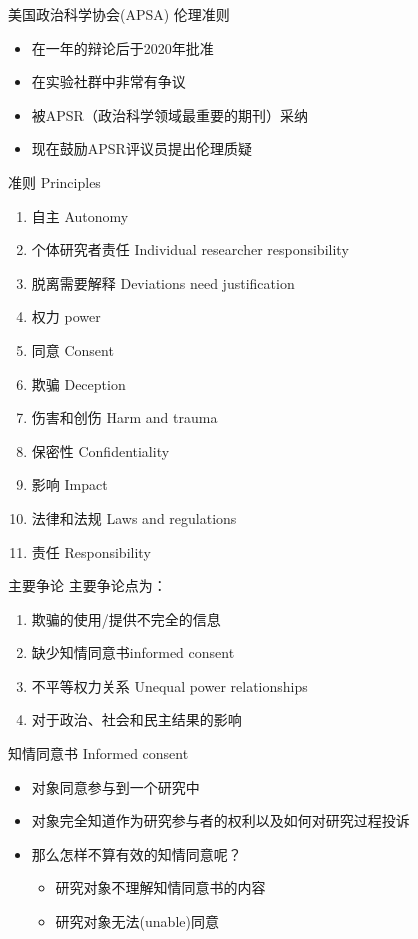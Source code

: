 \documentclass{beamer}
\begin{document}
\begin{frame}{美国政治科学协会(APSA) 伦理准则}
\begin{itemize}
    \item 在一年的辩论后于2020年批准
    \item 在\alert{实验}社群中非常有争议
    \item 被APSR（政治科学领域最重要的期刊）采纳
    \item 现在鼓励APSR评议员提出伦理质疑
\end{itemize}
\end{frame}

\begin{frame}{准则 Principles}
\begin{enumerate}
    \item 自主 Autonomy
    \item 个体研究者责任 Individual researcher responsibility
    \item 脱离需要解释 Deviations need justification
    \item 权力 power
    \item 同意 Consent
    \item 欺骗 Deception
    \item 伤害和创伤 Harm and trauma
    \item 保密性 Confidentiality
    \item 影响 Impact
    \item 法律和法规 Laws and regulations
    \item 责任 Responsibility
\end{enumerate}
\end{frame}

\begin{frame}{主要争论}
主要争论点为：
\begin{enumerate}
    \item 欺骗的使用/提供不完全的信息
    \item 缺少知情同意书informed consent
    \item 不平等权力关系 Unequal power relationships
    \item 对于政治、社会和民主结果的影响
\end{enumerate}
\end{frame}

\begin{frame}{知情同意书 Informed consent}
    \begin{itemize}
        \item 对象同意参与到一个研究中
        \item 对象完全知道作为研究参与者的权利以及如何对研究过程投诉
        \item 那么怎样不算有效的知情同意呢？
        \begin{itemize}
            \item 研究对象不理解知情同意书的内容
            \item 研究对象无法(unable)同意
        \end{itemize}
    \end{itemize}
\end{frame}
\end{document}
